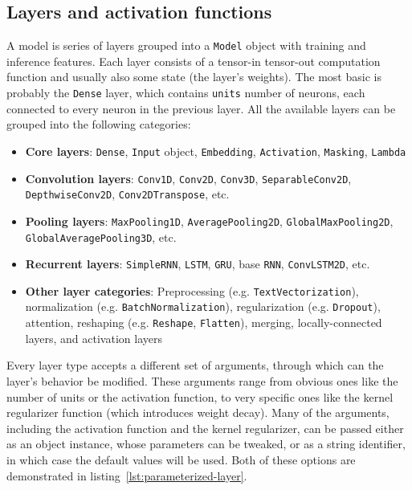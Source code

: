 \subsection*{Layers and activation functions}
\label{layers-and-activation-functions}
A model is series of layers grouped into a \texttt{Model} object with training and inference features.
Each layer consists of a tensor-in tensor-out computation function and usually also some state (the layer's weights).
The most basic is probably the \texttt{Dense} layer, which contains \texttt{units} number of neurons,
each connected to every neuron in the previous layer.
All the available layers can be grouped into the following categories:
\begin{itemize}
    \item \textbf{Core layers}: \texttt{Dense}, \texttt{Input} object, \texttt{Embedding}, \texttt{Activation},
    \texttt{Masking}, \texttt{Lambda}
    \item \textbf{Convolution layers}: \texttt{Conv1D}, \texttt{Conv2D}, \texttt{Conv3D}, \texttt{SeparableConv2D},\\ \texttt{DepthwiseConv2D}, \texttt{Conv2DTranspose}, etc.
    \item \textbf{Pooling layers}: \texttt{MaxPooling1D}, \texttt{AveragePooling2D}, \texttt{GlobalMaxPooling2D},\\
    \texttt{GlobalAveragePooling3D}, etc.
    \item \textbf{Recurrent layers}: \texttt{SimpleRNN}, \texttt{LSTM}, \texttt{GRU}, base \texttt{RNN},
    \texttt{ConvLSTM2D}, etc.
    \item \textbf{Other layer categories}: Preprocessing (e.g. \texttt{TextVectorization}),
    normalization (e.g. \texttt{BatchNormalization}), regularization (e.g. \texttt{Dropout}),
    attention, reshaping (e.g. \texttt{Reshape}, \texttt{Flatten}), merging, locally-connected layers,
    and activation layers
\end{itemize}

Every layer type accepts a different set of arguments, through which can the layer's behavior be modified.
These arguments range from obvious ones like the number of units or the activation function,
to very specific ones like the kernel regularizer function (which introduces weight decay).
Many of the arguments, including the activation function and the kernel regularizer,
can be passed either as an object instance, whose parameters can be tweaked,
or as a string identifier, in which case the default values will be used.
Both of these options are demonstrated in listing~\ref{lst:parameterized-layer}.

